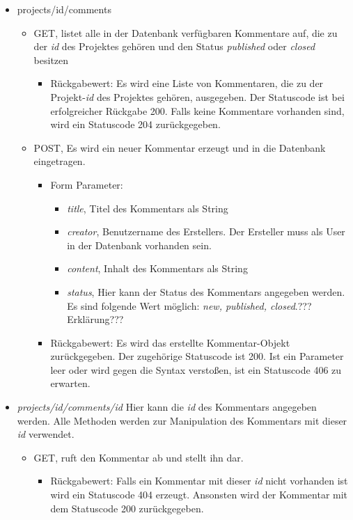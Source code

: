 \documentclass[12pt]{scrartcl}
\begin{document}
		\begin{itemize}
			\item projects/{id}/comments
			\begin{itemize}
				\item GET, listet alle in der Datenbank verfügbaren Kommentare auf, die zu der \emph{id} des Projektes gehören und  den Status \emph{published} oder \emph{closed} besitzen
				\begin{itemize}
					\item Rückgabewert: Es wird eine Liste von Kommentaren, die zu der Projekt-\emph{id} des Projektes gehören, ausgegeben. Der Statuscode ist bei erfolgreicher Rückgabe 200. Falls keine Kommentare vorhanden sind, wird ein Statuscode 204 zurückgegeben. 
				\end{itemize}
						\item POST, Es wird ein neuer Kommentar erzeugt und in die Datenbank eingetragen.
						\begin{itemize}
							\item Form Parameter:
							\begin{itemize}
								\item  \emph{title}, Titel des Kommentars als String
								\item  \emph{creator}, Benutzername des Erstellers. Der Ersteller muss als User in der Datenbank vorhanden sein.
								\item  \emph{content}, Inhalt des Kommentars als String
								\item  \emph{status}, Hier kann der Status des Kommentars angegeben werden. Es sind folgende Wert möglich: \emph{new, published, closed}.???Erklärung???
							\end{itemize}
							\item Rückgabewert: Es wird das erstellte Kommentar-Objekt zurückgegeben. Der zugehörige Statuscode ist 200. Ist ein Parameter leer oder wird gegen die Syntax verstoßen, ist ein Statuscode 406 zu erwarten.  
						\end{itemize}
			\end{itemize}
				\item \emph{projects/{id}/comments/{id}} Hier kann die \emph{id} des Kommentars angegeben werden. Alle Methoden werden zur Manipulation des Kommentars mit dieser \emph{id} verwendet.
				\begin{itemize}
						\item GET, ruft den Kommentar ab und stellt ihn dar. 
						\begin{itemize}
							\item Rückgabewert: Falls ein Kommentar mit dieser \emph{id} nicht vorhanden ist wird ein Statuscode 404 erzeugt. Ansonsten wird der Kommentar mit dem Statuscode 200 zurückgegeben.

\end{itemize}
\end{itemize}
\end{itemize}
\end{document}
